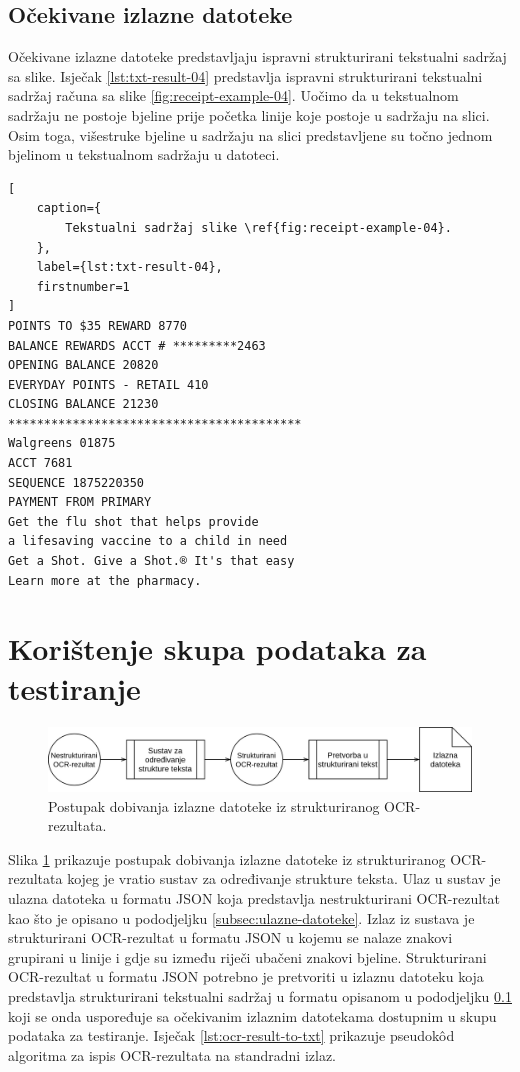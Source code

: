 \documentclass[times, utf8, zavrsni]{fer}
\begin{document}
\subsection{Očekivane izlazne datoteke}
\label{subsec:očekivane-izlazne-datoteke}
Očekivane izlazne datoteke predstavljaju ispravni strukturirani tekstualni
sadržaj sa slike. Isječak \ref{lst:txt-result-04} predstavlja ispravni
strukturirani tekstualni sadržaj računa sa slike \ref{fig:receipt-example-04}.
Uočimo da u tekstualnom sadržaju ne postoje bjeline prije početka linije koje
postoje u sadržaju na slici. Osim toga, višestruke bjeline u sadržaju na slici
predstavljene su točno jednom bjelinom u tekstualnom sadržaju u datoteci.

\begin{lstlisting}[
    caption={
        Tekstualni sadržaj slike \ref{fig:receipt-example-04}.
    },
    label={lst:txt-result-04},
    firstnumber=1
]
POINTS TO $35 REWARD 8770
BALANCE REWARDS ACCT # *********2463
OPENING BALANCE 20820
EVERYDAY POINTS - RETAIL 410
CLOSING BALANCE 21230
*****************************************
Walgreens 01875
ACCT 7681
SEQUENCE 1875220350
PAYMENT FROM PRIMARY
Get the flu shot that helps provide
a lifesaving vaccine to a child in need
Get a Shot. Give a Shot.® It's that easy
Learn more at the pharmacy.
\end{lstlisting}








\section{Korištenje skupa podataka za testiranje}
\begin{figure}[htb]
    \centering
    \captionsetup{justification=centering,margin=2cm}
    \includegraphics[width=\textwidth]{images/sustav-02.png}
    \caption{
        Postupak dobivanja izlazne datoteke iz strukturiranog OCR-rezultata.
    }
    \label{fig:sustav-02}
\end{figure}
Slika \ref{fig:sustav-02} prikazuje postupak dobivanja izlazne datoteke iz
strukturiranog OCR-rezultata kojeg je vratio sustav za određivanje strukture
teksta. Ulaz u sustav je ulazna datoteka u formatu JSON koja predstavlja
nestrukturirani OCR-rezultat kao što je opisano u pododjeljku
\ref{subsec:ulazne-datoteke}.
Izlaz iz sustava je strukturirani OCR-rezultat u formatu JSON u kojemu se nalaze
znakovi grupirani u linije i gdje su između riječi ubačeni znakovi bjeline.
Strukturirani OCR-rezultat u formatu JSON potrebno je pretvoriti u izlaznu
datoteku koja predstavlja strukturirani tekstualni sadržaj u formatu opisanom u
pododjeljku \ref{subsec:očekivane-izlazne-datoteke} koji se onda
uspoređuje sa očekivanim izlaznim datotekama dostupnim u skupu podataka za
testiranje. Isječak \ref{lst:ocr-result-to-txt} prikazuje pseudokôd algoritma
za ispis OCR-rezultata na standradni izlaz.
\end{document}
